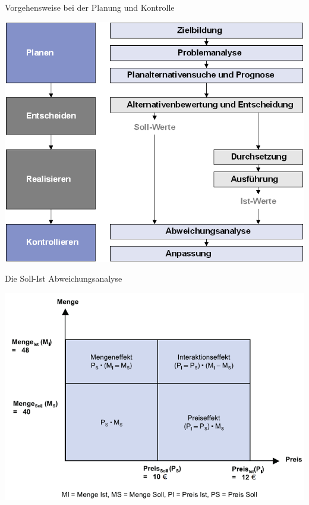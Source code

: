 \documentclass[12pt,ngerman,a4paper,ignorenonframetext,]{beamer}
\begin{document}
\begin{frame}{Vorgehensweise bei der Planung und Kontrolle}
\protect\hypertarget{vorgehensweise-bei-der-planung-und-kontrolle}{}

\begin{center}\includegraphics[width=0.7\linewidth]{./images/Marketingcontrolling/Vorgehensweise1} \end{center}

\end{frame}

\begin{frame}{Die Soll-Ist Abweichungsanalyse}
\protect\hypertarget{die-soll-ist-abweichungsanalyse}{}

\begin{center}\includegraphics[width=0.7\linewidth]{./images/Marketingcontrolling/Abweichungsanalyse} \end{center}

\end{frame}
\end{document}
